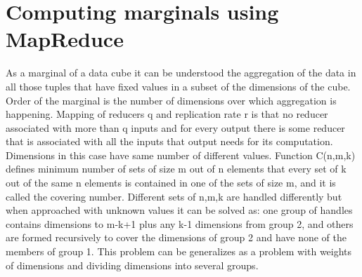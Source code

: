 \section{Computing marginals using MapReduce}
As a marginal of a data cube it can be understood the aggregation of the data in all those tuples that have fixed values in a subset of the dimensions of the cube. Order of the marginal is the number of dimensions over which aggregation is happening. Mapping of reducers q and replication rate r is that no reducer associated with more than q inputs and for every output there is some reducer that is associated with all the inputs that output needs for its computation. Dimensions in this case have same number of different values.
Function C(n,m,k) defines minimum number of sets of size m out of n elements that every set of k out of the same n elements is contained in one of the sets of size m, and it is called the covering number.
Different sets of n,m,k are handled differently but when approached with unknown values it can be solved as: one group of handles contains dimensions to m-k+1 plus any k-1 dimensions from group 2, and others are formed recursively to cover the dimensions of group 2 and have none of the members of group 1.
This problem can be generalizes as a problem with weights of dimensions and dividing dimensions into several groups. \cite{marginals}

